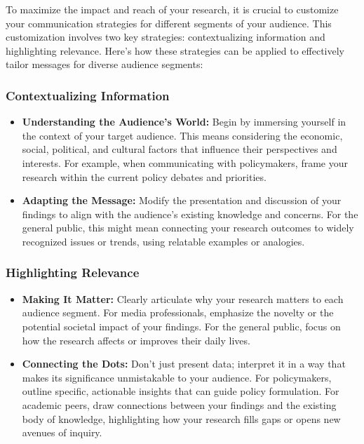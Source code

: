 \documentclass[
]{book}
\providecommand{\tightlist}{%
  \setlength{\itemsep}{0pt}\setlength{\parskip}{0pt}}
\begin{document}
To maximize the impact and reach of your research, it is crucial to customize your communication strategies for different segments of your audience. This customization involves two key strategies: contextualizing information and highlighting relevance. Here's how these strategies can be applied to effectively tailor messages for diverse audience segments:

\hypertarget{contextualizing-information}{%
\subsubsection*{Contextualizing Information}\label{contextualizing-information}}

\begin{itemize}
\tightlist
\item
  \textbf{Understanding the Audience's World:} Begin by immersing yourself in the context of your target audience. This means considering the economic, social, political, and cultural factors that influence their perspectives and interests. For example, when communicating with policymakers, frame your research within the current policy debates and priorities.
\item
  \textbf{Adapting the Message:} Modify the presentation and discussion of your findings to align with the audience's existing knowledge and concerns. For the general public, this might mean connecting your research outcomes to widely recognized issues or trends, using relatable examples or analogies.
\end{itemize}

\hypertarget{highlighting-relevance}{%
\subsubsection*{Highlighting Relevance}\label{highlighting-relevance}}

\begin{itemize}
\tightlist
\item
  \textbf{Making It Matter:} Clearly articulate why your research matters to each audience segment. For media professionals, emphasize the novelty or the potential societal impact of your findings. For the general public, focus on how the research affects or improves their daily lives.
\item
  \textbf{Connecting the Dots:} Don't just present data; interpret it in a way that makes its significance unmistakable to your audience. For policymakers, outline specific, actionable insights that can guide policy formulation. For academic peers, draw connections between your findings and the existing body of knowledge, highlighting how your research fills gaps or opens new avenues of inquiry.
\end{itemize}
\end{document}
